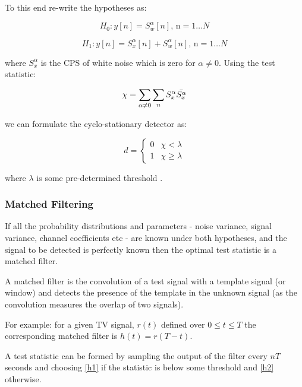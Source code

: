 To this end re-write the hypotheses as:

\begin{equation}
H_{0}: y\left[n\right] = S_{w}^\alpha \left[n\right] \text{, n} =  1 \ldots N 
\end{equation}
\label{c1}

\begin{equation}
H_{1}: y\left[n \right] = S_{x}^{\alpha} \left[n\right] + S_{w}^{\alpha} \left[n\right] \text{, n} =  1 \ldots N 
\end{equation}
\label{c2}

where \(S_{x}^{\alpha}\) is the CPS of white noise which is zero for \(\alpha \neq 0 \).  Using the test statistic:

\begin{equation}
\chi = \sum_{\alpha \neq 0} \sum_{n} S_{x}^{\alpha} \bar{S_{x}^{\alpha}}
\end{equation}

we can formulate the cyclo-stationary detector as:

\begin{equation}
 d =
  \begin{cases}
   0 & \chi < \lambda  \\
   1 & \chi \geq \lambda
  \end{cases}
\end{equation}

where \(\lambda\) is some pre-determined threshold \cite{Ghozzi2006}. 

\subsubsection{Matched Filtering}
If all the probability distributions and parameters  - noise variance, signal variance, channel coefficients etc - are known under both hypotheses, and the signal to be detected is perfectly known then the optimal test statistic is a matched filter.

A matched filter is the convolution of a test signal with a template signal (or window) and detects the presence of the template in the unknown signal (as the convolution measures the overlap of two signals).

For example: for a given TV signal, \(r\left(t\right)\) defined over \(0 \leq t \leq T\) the corresponding matched filter is \(h\left(t\right) = r\left(T - t\right)\). 

A test statistic can be formed by sampling the output of the filter every \(nT\) seconds and choosing \ref{h1} if the statistic is below some threshold and \ref{h2} otherwise.

